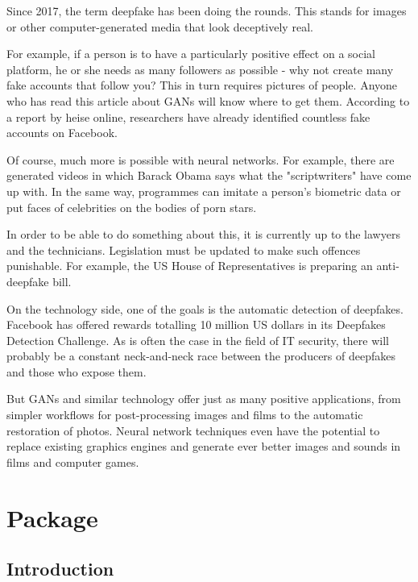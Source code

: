 Since 2017, the term deepfake has been doing the rounds. This stands for images or other computer-generated media that look deceptively real.

For example, if a person is to have a particularly positive effect on a social platform, he or she needs as many followers as possible - why not create many fake accounts that follow you? This in turn requires pictures of people. Anyone who has read this article about GANs will know where to get them. According to a report by heise online, researchers have already identified countless fake accounts on Facebook.

Of course, much more is possible with neural networks. For example, there are generated videos in which Barack Obama says what the "scriptwriters" have come up with. In the same way, programmes can imitate a person's biometric data or put faces of celebrities on the bodies of porn stars. 

In order to be able to do something about this, it is currently up to the lawyers and the technicians. Legislation must be updated to make such offences punishable. For example, the US House of Representatives is preparing an anti-deepfake bill.

On the technology side, one of the goals is the automatic detection of deepfakes. Facebook has offered rewards totalling 10 million US dollars in its Deepfakes Detection Challenge. As is often the case in the field of IT security, there will probably be a constant neck-and-neck race between the producers of deepfakes and those who expose them.

But GANs and similar technology offer just as many positive applications, from simpler workflows for post-processing images and films to the automatic restoration of photos. Neural network techniques even have the potential to replace existing graphics engines and generate ever better images and sounds in films and computer games.



\chapter{Package }


\section{Introduction}



